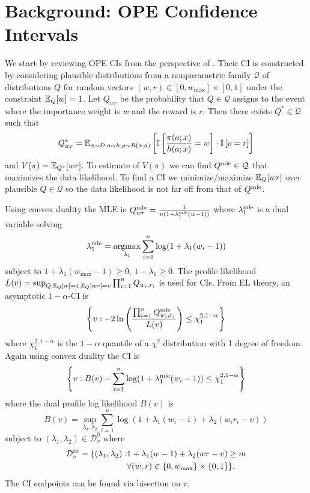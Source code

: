 \section{Background: OPE Confidence Intervals}
We start by reviewing OPE CIs from the perspective of
\cite{karampatziakis2019empirical}. Their CI is constructed by considering
plausible distributions from a nonparametric family $\mathcal{Q}$ of
distributions  $Q$ for random vectors $(w,r) \in [0,w_{\max}]\times [0,1]$
under the constraint $\mathbb{E}_Q[w]=1$. Let $Q_{wr}$ be the probability that $Q \in
\mathcal{Q}$ assigns to the event where the importance weight is $w$ and the
reward is $r$. Then there exists $Q^* \in \mathcal{Q}$ such that
\[
Q^*_{wr}=\mathbb{E}_{x\sim D,a\sim h,\rho\sim R(x,a)}
\left[
\mathbb{I}\left[\frac{\pi(a;x)}{h(a;x)}=w\right]\cdot
\mathbb{I}\left[\rho=r\right]
\right]
\]
and 
$
V(\pi)=\mathbb{E}_{Q^*}[wr]
$.
To estimate of $V(\pi)$ we can find $Q^{\textrm{mle}} \in \mathcal{Q}$ that maximizes
the data likelihood. To find a CI we minimize/maximize $\mathbb{E}_Q[wr]$ over
plausible $Q \in \mathcal{Q}$ so the data likelihood is not far off from that
of $Q^{\textrm{mle}}$.

Using convex duality the MLE is
$
Q^{\textrm{mle}}_{wr} = \frac{1}{n(1+\lambda_1^{\textrm{mle}}(w-1))}
$
where $\lambda_1^{\textrm{mle}}$ is a dual variable solving
\[
\lambda_1^{\textrm{mle}} = \operatorname*{argmax}_{\lambda_1} \sum_{i=1}^n \log(1+\lambda_1(w_i-1))
\]
subject to $1+\lambda_1(w_{\max}-1)\geq 0$, $1-\lambda_1\geq 0$.  The profile
likelihood
$
L(v)=\sup_{Q: \mathbb{E}_Q[w]=1, \mathbb{E}_Q[wr]=v} \prod_{i=1}^n Q_{w_i,r_i}
$
is used for CIs. From EL theory, an asymptotic $1-\alpha$-CI is
\[
\left\{v: -2\ln\left(\frac{\prod_{i=1}^n Q^{\textrm{mle}}_{w_i,r_i}}{L(v)}\right)
\leq \chi_1^{2,1-\alpha}\right\}
\]
where $\chi_1^{2,1-\alpha}$ is the $1-\alpha$ quantile of a $\chi^2$
distribution with 1 degree of freedom.  Again using convex duality the CI is
\[
\left\{v: 
B(v)-\sum_{i=1}^n\log(1+\lambda_1^{\textrm{mle}}(w_i-1))
\leq \chi_1^{2,1-\alpha}\right\}
\]
where the dual profile log likelihood $B(v)$ is
\begin{equation}
B(v) = \sup_{\lambda_1,\lambda_2} \sum_{i=1}^n \log(1+\lambda_1(w_i-1)+\lambda_2(w_i r_i -v))    \label{eq:dual-lik}
\end{equation}
subject to $(\lambda_1,\lambda_2) \in \mathcal{D}_v^0$ where 
\begin{align}
\mathcal{D}_v^{m} =
\{(\lambda_1,\lambda_2): & 1+\lambda_1(w-1)+\lambda_2(wr-v)\geq m \label{eq:batch-domain}\notag\\
                         & \forall (w,r) \in \{0,w_{\max}\}\times \{0,1\}
\}.
\end{align}
The CI endpoints can be found via bisection on $v$.

